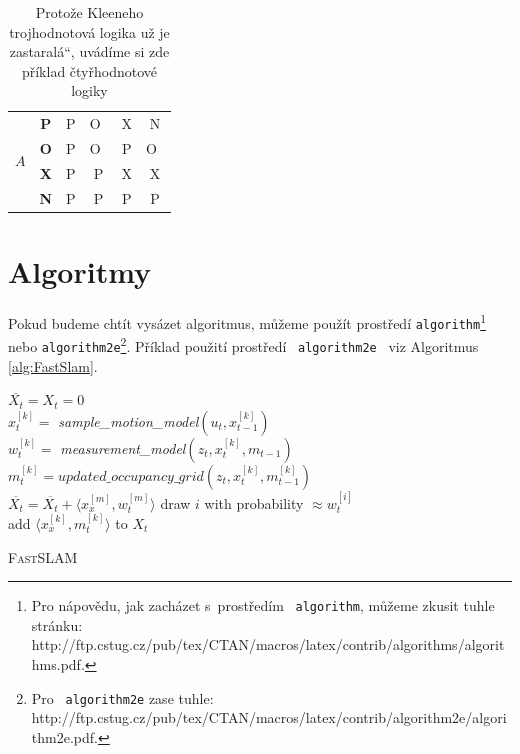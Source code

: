 \documentclass[11pt,a4paper]{article}
\newcommand{\myuv}[1]{\quotedblbase #1\textquotedblleft}
\begin{document}
\begin{table}[h]
\begin{center}
\begin{tabular}{|c|c|c|c|c|c|}
				\multirow{4}{*}{$A$}				& \textbf{P} & P & O~& X & N						\\	\cline{2-6}
													& \textbf{O} & P & O~& P & O~\\	\cline{2-6}
													& \textbf{X} & P & P & X & X						\\	\cline{2-6}
													& \textbf{N} & P & P & P & P						\\	\hline
			\end{tabular}
			\hfill \hfil
			\caption{Protože Kleeneho trojhodnotová logika už je \myuv{zastaralá}, uvádíme si zde příklad čtyřhodnotové logiky}
			\label{tab:Kleen}
		\end{center}
	\end{table}



	\pagebreak

	\section{Algoritmy}
	\label{sec:algorithm}
	Pokud budeme chtít vysázet algoritmus, můžeme použít prostředí \texttt{algorithm}\footnote[2]{\raggedright Pro nápovědu, jak zacházet s~prostředím \, \texttt{algorithm}, můžeme zkusit tuhle stránku:
		http://ftp.cstug.cz/pub/tex/CTAN/macros/latex/contrib/algorithms/algorithms.pdf.} nebo \texttt{algorithm2e}\footnote[3]{Pro \, \texttt{algorithm2e} zase tuhle:
		http://ftp.cstug.cz/pub/tex/CTAN/macros/latex/contrib/algorithm2e/algorithm2e.pdf.}. \linebreak
	Příklad použití prostředí \, \texttt{algorithm2e} \, viz Algoritmus \ref{alg:FastSlam}.
	
	\bigskip
	\bigskip
	
	\begin{algorithm}[H]
		
		\SetNlSty{}{}{:}
		\SetInd{1em}{1em}
		\SetNlSkip{-1.33em} %
		
		\BlankLine
		\Indp \Indp
		$\overline{X_t} = X_t = 0$\\
		{ 
			$x_t^{[k]} =$ \emph{sample\_motion\_model}$(u_t,x_{t-1}^{[k]})$		\\
			$w_t^{[k]} =$ \emph{measurement\_model}$(z_t,x_t^{[k]},m_{t-1})$	\\
			$m_t^{[k]} = updated\_occupancy\_grid(z_t,x_t^{[k]},m_{t-1}^{[k]})$	\\
			$\overline{X_t} = \overline{X_t} + \langle x_x^{[m]},w_t^{[m]}\rangle$
		}
		{
			draw $i$ with probability $\approx w_t^{[i]}$\\
			add $\langle x_x^{[k]},m_t^{[k]}\rangle$ to $X_t$\\
		}
		
		\caption{\textsc{Fast}SLAM}
		\label{alg:FastSlam}
	\end{algorithm}
	
\end{document}
